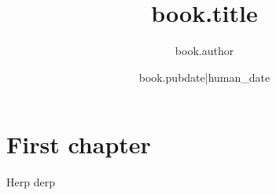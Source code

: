 \documentclass{book}
\title{ {{ book.title }} }
\author{ {{ book.author }} }
\date{ {{ book.pubdate|human_date }} }
\begin{document}
\maketitle

\chapter{First chapter}
Herp derp
\end{document}
